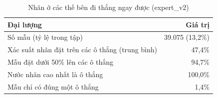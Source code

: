 \begin{table}[H]
  \centering
  \small
  \caption{Nhãn ở các thế bên đi thắng ngay được (expert\_v2)}
  \label{tab:cs-dl-thangngay}
  \begin{tabular}{lr}
    \toprule
    Đại lượng & Giá trị \\
    \midrule
    Số mẫu (tỷ lệ trong tập) & 39.075 (13,2\%) \\
    Xác suất nhãn đặt trên các ô thắng (trung bình) & 47,4\% \\
    Mẫu đặt dưới 50\% lên các ô thắng & 94,7\% \\
    Nước nhãn cao nhất là ô thắng & 100,0\% \\
    Mẫu chỉ có đúng một ô thắng & 1,4\% \\
    \bottomrule
  \end{tabular}
\end{table}
